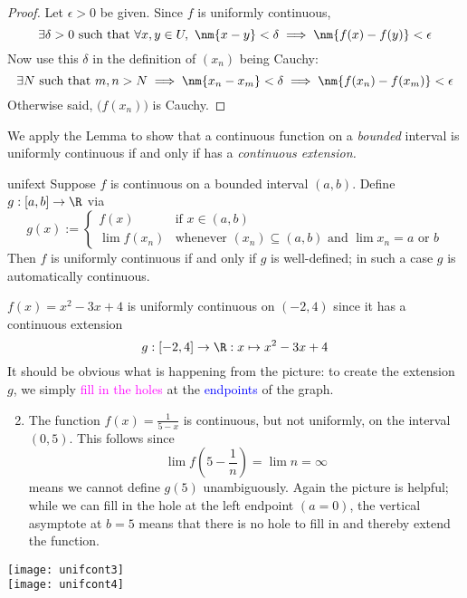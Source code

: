 \begin{proof}
	Let $\epsilon>0$ be given. Since $f$ is uniformly continuous,
	\[\exists\delta>0\text{ such that }\forall x,y\in U,\ \nm{x-y}<\delta\implies\nm{f(x)-f(y)}<\epsilon\]
	Now use this $\delta$ in the definition of $(x_n)$ being Cauchy:\footnotemark
	\[\exists N\text{ such that }m,n>N\implies\nm{x_n-x_m}<\delta\implies\nm{f(x_n)-f(x_m)}<\epsilon\]
	Otherwise said, $\bigl(f(x_n)\bigr)$ is Cauchy.
\end{proof}
\vspace{-8pt}


\goodbreak

We apply the Lemma to show that a continuous function on a \emph{bounded} interval is uniformly continuous if and only if has a \emph{continuous extension.}

\begin{thm}{}{unifext}
	Suppose $f$ is continuous on a bounded interval $(a,b)$. Define $g:[a,b]\to \R$ via
	\[
		g(x):=\begin{cases}
		f(x)&\text{if }x\in (a,b)\\
		\lim f(x_n)&\text{whenever $(x_n)\subseteq (a,b)$ and $\lim x_n=a$ or $b$}
		\end{cases}
	\]
	Then $f$ is uniformly continuous if and only if $g$ is well-defined; in such a case $g$ is automatically continuous.
\end{thm}

\begin{examples}[lower separated=false, sidebyside, sidebyside align=top seam, sidebyside gap=0pt, righthand width=0.3\linewidth]{}{}
	\exstart $f(x)=x^2-3x+4$ is uniformly continuous on $(-2,4)$ since it has a continuous extension
	\[g:[-2,4]\to\R:x\mapsto x^2-3x+4\]
	It should be obvious what is happening from the picture: to create the extension $g$, we simply \textcolor{Magenta}{fill in the holes} at the \textcolor{blue}{endpoints} of the graph.   
	\bigskip\smallskip
	\begin{enumerate}\setcounter{enumi}{1}
	  \item The function $f(x)=\frac 1{5-x}$ is continuous, but not uniformly, on the interval $(0,5)$. This follows since
		\[\lim f\left(5-\frac 1n\right)=\lim n=\infty\]
		means we cannot define $g(5)$ unambiguously. Again the picture is helpful; while we can fill in the hole at the left endpoint $(a=0)$, the vertical asymptote at $b=5$ means that there is no hole to fill in and thereby extend the function.
	\end{enumerate}
	\tcblower
	\flushright\texttt{[image: unifcont3]}\\
	\texttt{[image: unifcont4]}
\end{examples}

